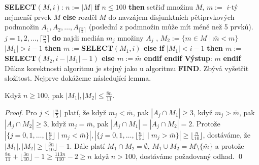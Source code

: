 \documentclass[a4paper,12pt]{article}
\begin{document}
{\bf SELECT$(M,i)$}:\newline 
$n:=|M|$\newline 
{\bf if} $n\le 100$ {\bf then\newline 
\phantom{{\rm---}}}setřiď množinu $M$, $m:=$ $i$-tý nejmenší 
prvek $M$\newline 
{\bf else\newline 
\phantom{{\rm---}}}rozděl $M$ do navzájem disjunktních 
pětiprvkových podmnožin $A_1,A_2,\dots,A_{\lceil\frac n5\rceil}$\newline 
\phantom{---}(poslední z podmnožin může mít méně než 5 prvků).\newline 
\phantom{---}{\bf for every} $j=1,2,\dots,\lceil\frac n5\rceil$ {\bf do\newline 
\phantom{{\rm------}}}najdi medián $m_j$ množiny $A_j$\newline 
{}, $M_2:=\{m\in 
M\mid\bar {m}<m\}$\newline 
\phantom{---}{\bf if} $|M_1|>i-1$ {\bf then\newline 
\phantom{{\rm ------}}$m:=$SELECT$(M_1,i)$\newline 
\phantom{{\rm ---}}else\newline 
\phantom{{\rm------}}if} $|M_1|<i-1$ {\bf then\newline 
\phantom{{\rm ---------}}$m:=$SELECT$(M_2,i-|M_1|-1)$\newline 
\phantom{{\rm ------}}else\newline 
\phantom{{\rm ---------}}$m:=\bar {m}$\newline 
\phantom{{\rm ------}}endif\newline 
\phantom{{\rm ---}}endif\newline 
\phantom{{\rm ---}}Výstup}: $m$\newline 
{\bf endif
}
Důkaz korektnosti algoritmu je stejný 
jako u algoritmu {\bf FIND}. 
Zbývá vyšetřit složitost. Nej\-prve dokážeme následující 
lemma.

\begin{lemma}Když $n\ge 100$, pak $|M_1|,|M_2|\le\frac {8n}{
11}$.
\end{lemma}

\begin{proof} Pro $j\le\lfloor\frac n5\rfloor$ platí, že když $
m_j<\bar {m}$, pak 
$|A_j\cap M_1|\ge 3$, když $m_j>\bar {m}$, pak $|A_j\cap M_2|\ge 
3$, když $m_j=\bar {m}$, 
pak $|A_j\cap M_1|=|A_j\cap M_2|=2$.  Protože 
$|\{j=0,1,\dots,\lfloor\frac n5\rfloor\mid m_j<\bar {m}\}|,|\{j=0
,1,\dots,\lfloor\frac n5\rfloor\mid m_j>\bar {m}\}|\ge\lfloor\frac 
n{10}\rfloor$, 
dostáváme, že $|M_1|,|M_2|\ge\lfloor\frac {3n}{10}\rfloor 
-1$.  Dále platí $M_1\cap M_2=\emptyset$, 
$M_1\cup M_2=M\setminus \{\bar {m}\}$ a protože $\frac {8n}{11}
+\lfloor\frac {3n}{10}\rfloor -1\ge\frac {113n}{110}-2\ge n$ 
když $n>100$, dostáváme požadovaný odhad. \qed
\end{proof}
\end{document}
